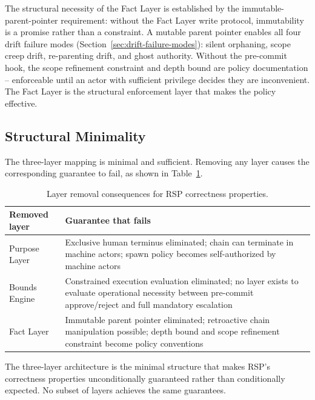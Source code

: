 The structural necessity of the Fact Layer is established by the immutable-parent-pointer requirement: without the Fact Layer write protocol, immutability is a promise rather than a constraint. A mutable parent pointer enables all four drift failure modes (Section~\ref{sec:drift-failure-modes}): silent orphaning, scope creep drift, re-parenting drift, and ghost authority. Without the pre-commit hook, the scope refinement constraint and depth bound are policy documentation -- enforceable until an actor with sufficient privilege decides they are inconvenient. The Fact Layer is the structural enforcement layer that makes the policy effective.

\subsection{Structural Minimality}
\label{sec:rs-minimality}

The three-layer mapping is minimal and sufficient. Removing any layer causes the corresponding guarantee to fail, as shown in Table~\ref{tab:layer-minimality-rs}.

\begin{table}[h]
\centering
\begin{tabular}{p{3.2cm} p{4.8cm}}
\toprule
\textbf{Removed layer} & \textbf{Guarantee that fails} \\
\midrule
Purpose Layer & Exclusive human terminus eliminated; chain can terminate in machine actors; spawn policy becomes self-authorized by machine actors \\
Bounds Engine & Constrained execution evaluation eliminated; no layer exists to evaluate operational necessity between pre-commit approve/reject and full mandatory escalation \\
Fact Layer & Immutable parent pointer eliminated; retroactive chain manipulation possible; depth bound and scope refinement constraint become policy conventions \\
\bottomrule
\end{tabular}
\caption{Layer removal consequences for RSP correctness properties.}
\label{tab:layer-minimality-rs}
\end{table}

The three-layer architecture is the minimal structure that makes RSP's correctness properties unconditionally guaranteed rather than conditionally expected. No subset of layers achieves the same guarantees.